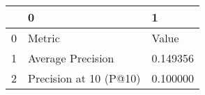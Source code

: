 \begin{tabular}{lll}
\toprule
 & 0 & 1 \\
\midrule
0 & Metric & Value \\
1 & Average Precision & 0.149356 \\
2 & Precision at 10 (P@10) & 0.100000 \\
\bottomrule
\end{tabular}

